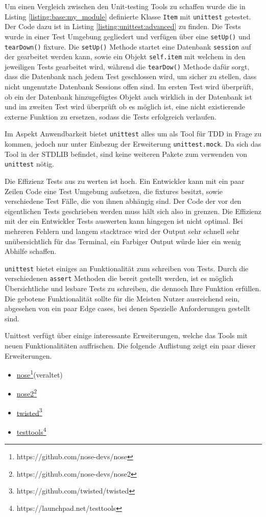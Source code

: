 Um einen Vergleich zwischen den Unit-testing Tools zu schaffen wurde die in
Listing \ref{listing:base:my_module} definierte Klasse \lstinline{Item} mit
\lstinline{unittest} getestet. Der Code dazu ist in Listing
\ref{listing:unittest:advanced} zu finden.
Die Tests wurde in einer Test Umgebung gegliedert und verfügen über eine
\lstinline{setUp()} und \lstinline{tearDown()} \Gls{fixture}. Die
\lstinline{setUp()} Methode startet eine Datenbank \lstinline{session} auf der
gearbeitet werden kann, sowie ein Objekt \lstinline{self.item} mit welchem in
den jeweiligen Tests gearbeitet wird, während die
\lstinline{tearDow()} Methode dafür sorgt, dass die Datenbank nach jedem Test
geschlossen wird, um sicher zu stellen, dass nicht ungenutzte Datenbank Sessions
offen sind.
Im ersten Test wird überprüft, ob ein der Datenbank hinzugefügtes Objekt auch
wirklich in der Datenbank ist und im zweiten Test wird überprüft ob es möglich
ist, eine nicht existierende externe Funktion zu ersetzen, sodass die Tests
erfolgreich verlaufen.
\newline

Im Aspekt Anwendbarkeit bietet \lstinline|unittest| alles um als Tool für TDD in
Frage zu kommen, jedoch nur unter Einbezug der Erweiterung
\lstinline|unittest.mock|. Da sich das Tool in der STDLIB befindet, sind keine
weiteren Pakete zum verwenden von \lstinline{unittest} nötig.

Die Effizienz Tests aus zu werten ist hoch. Ein Entwickler kann mit ein paar
Zeilen Code eine Test Umgebung aufsetzen, die \Glspl{fixture} besitzt, sowie
verschiedene Test Fälle, die von ihnen abhängig sind. Der Code der vor den
eigentlichen Tests geschrieben werden muss hält sich also in grenzen. Die
Effizienz mit der ein Entwickler Tests auswerten kann hingegen ist nicht optimal.
Bei mehreren Fehlern und langem \gls{stacktrace} wird der Output sehr schnell
sehr unübersichtlich für das Terminal, ein Farbiger Output würde hier ein wenig
Abhilfe schaffen.

\lstinline{unittest} bietet einiges an Funktionalität zum schreiben von Tests.
Durch die verschiedenen \lstinline{assert} Methoden die bereit gestellt werden,
ist es möglich Übersichtliche und lesbare Tests zu schreiben, die dennoch Ihre
Funktion erfüllen. Die gebotene Funktionalität sollte für die Meisten Nutzer
ausreichend sein, abgesehen von ein paar Edge cases, bei denen Spezielle
Anforderungen  gestellt sind.

Unittest verfügt über einige interessante Erweiterungen, welche das Tools mit
neuen Funktionalitäten auffrischen. Die folgende Auflistung zeigt ein paar
dieser Erweiterungen.
\begin{itemize}
    \item \href{https://github.com/nose-devs/nose}{nose}\footnote{https://github.com/nose-devs/nose}(veraltet)
    \item \href{https://github.com/nose-devs/nose2}{nose2}\footnote{https://github.com/nose-devs/nose2}
    \item \href{https://github.com/twisted/twisted}{twisted}\footnote{https://github.com/twisted/twisted}
    \item \href{https://launchpad.net/testtools}{testtools}\footnote{https://launchpad.net/testtools}
\end{itemize}